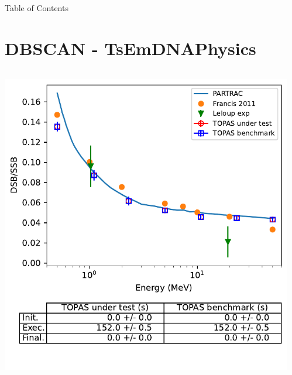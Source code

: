 \documentclass[aspectratio=1610]{beamer}
\title{\SUTname}
\subtitle{Regression testing (cf.\ \benchmarkname)}
\author{Jos\'e Ramos-M\'endez, Naoki D. Kondo, and Thongchai A.M. Masilela}
\institute{University of California San Francisco}
\date{\today}
\begin{document}
\frame{\titlepage}


\begin{frame}[allowframebreaks]{Table of Contents}
  \tableofcontents[sections={1-11}]
    \framebreak
  \tableofcontents[sections={12-}]
\end{frame}

\section{DBSCAN - TsEmDNAPhysics}

\begin{frame}{\secname}
 \begin{columns}
  \begin{column}{0.4\linewidth}
   \includegraphics[width=1.1\textwidth]{./DBSCAN/DBSCAN2_TsEmDNAPhysics}
  \end{column}
  \begin{column}{0.6\linewidth} 

\end{column}
\end{columns}
\end{frame}
\end{document}
